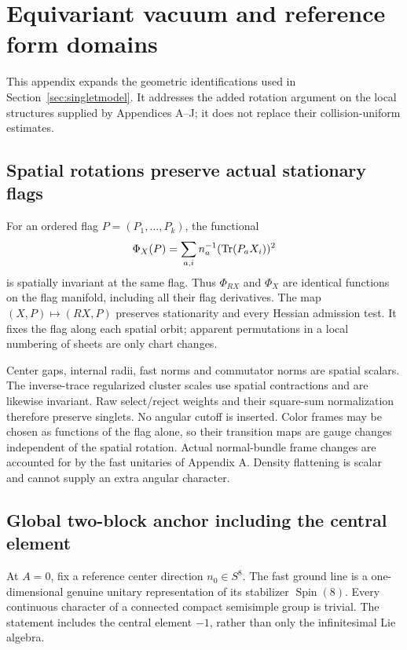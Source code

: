 \clearpage
\section{Equivariant vacuum and reference form domains}\label{app:model}
This appendix expands the geometric identifications used in Section~\ref{sec:singletmodel}. It addresses the added rotation argument on the local structures supplied by Appendices A--J; it does not replace their collision-uniform estimates.

\subsection{Spatial rotations preserve actual stationary flags}
For an ordered flag $P=(P_1,\ldots,P_k)$, the functional
\begin{equation}
 \Phi_X(P)=\sum_{a,i}n_a^{-1}(\operatorname{Tr}(P_aX_i))^2
\end{equation}
is spatially invariant at the same flag. Thus $\Phi_{RX}$ and $\Phi_X$ are identical functions on the flag manifold, including all their flag derivatives. The map $(X,P)\mapsto(RX,P)$ preserves stationarity and every Hessian admission test. It fixes the flag along each spatial orbit; apparent permutations in a local numbering of sheets are only chart changes.

Center gaps, internal radii, fast norms and commutator norms are spatial scalars. The inverse-trace regularized cluster scales use spatial contractions and are likewise invariant. Raw select/reject weights and their square-sum normalization therefore preserve singlets. No angular cutoff is inserted. Color frames may be chosen as functions of the flag alone, so their transition maps are gauge changes independent of the spatial rotation. Actual normal-bundle frame changes are accounted for by the fast unitaries of Appendix A. Density flattening is scalar and cannot supply an extra angular character.

\subsection{Global two-block anchor including the central element}
At $A=0$, fix a reference center direction $n_0\in S^8$. The fast ground line is a one-dimensional genuine unitary representation of its stabilizer $\operatorname{Spin}(8)$. Every continuous character of a connected compact semisimple group is trivial. The statement includes the central element $-1$, rather than only the infinitesimal Lie algebra.


